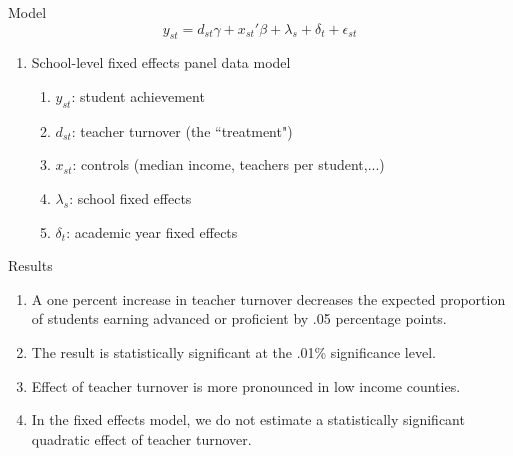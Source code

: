 \documentclass[notes]{beamer}
\begin{document}


\begin{frame}{Model}
$$y_{st} = d_{st}\gamma + x_{st}'\beta + \lambda_s + \delta_t + \epsilon_{st}$$
\begin{enumerate}[I]
\item School-level fixed effects panel data model
    \begin{enumerate}[i]
        \item $y_{st}$: student achievement
        \item $d_{st}$: teacher turnover (the ``treatment")
        \item $x_{st}$: controls (median income, teachers per student,...)
        \item $\lambda_s$: school fixed effects
        \item $\delta_t$: academic year fixed effects
    \end{enumerate}
\end{enumerate}
\end{frame}



\begin{frame}{Results}
\begin{enumerate}[I]
    \item A one percent increase in teacher turnover decreases the expected proportion of students earning advanced or proficient by .05 percentage points.
    \item The result is statistically significant at the .01\% significance level.
    \item Effect of teacher turnover is more pronounced in low income counties.

    \item In the fixed effects model, we do not estimate a statistically significant quadratic effect of teacher turnover.
\end{enumerate}
\end{frame}
\end{document}
